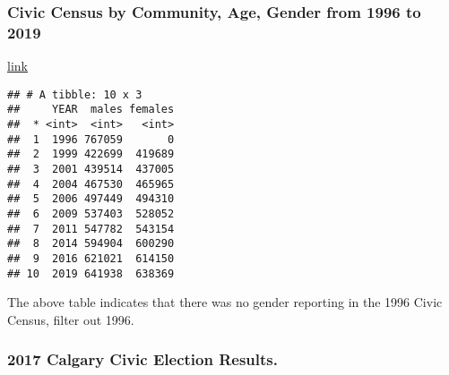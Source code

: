 \documentclass[
]{article}
\newenvironment{Shaded}{\begin{snugshade}}{\end{snugshade}}
\newcommand{\DataTypeTok}[1]{\textcolor[rgb]{0.13,0.29,0.53}{#1}}
\newcommand{\KeywordTok}[1]{\textcolor[rgb]{0.13,0.29,0.53}{\textbf{#1}}}
\newcommand{\NormalTok}[1]{#1}
\newcommand{\OperatorTok}[1]{\textcolor[rgb]{0.81,0.36,0.00}{\textbf{#1}}}
\newcommand{\StringTok}[1]{\textcolor[rgb]{0.31,0.60,0.02}{#1}}
\begin{document}
\hypertarget{civic-census-by-community-age-gender-from-1996-to-2019}{%
\subsubsection{Civic Census by Community, Age, Gender from 1996 to
2019}\label{civic-census-by-community-age-gender-from-1996-to-2019}}

\href{https://data.calgary.ca/Demographics/Civic-Census-by-Community-Age-and-Gender/vsk6-ghca}{link}

\begin{Shaded}
\end{Shaded}

\begin{verbatim}
## # A tibble: 10 x 3
##     YEAR  males females
##  * <int>  <int>   <int>
##  1  1996 767059       0
##  2  1999 422699  419689
##  3  2001 439514  437005
##  4  2004 467530  465965
##  5  2006 497449  494310
##  6  2009 537403  528052
##  7  2011 547782  543154
##  8  2014 594904  600290
##  9  2016 621021  614150
## 10  2019 641938  638369
\end{verbatim}

The above table indicates that there was no gender reporting in the 1996
Civic Census, filter out 1996.

\begin{Shaded}
\end{Shaded}

\hypertarget{calgary-civic-election-results.}{%
\subsubsection{2017 Calgary Civic Election
Results.}\label{calgary-civic-election-results.}}
\end{document}
